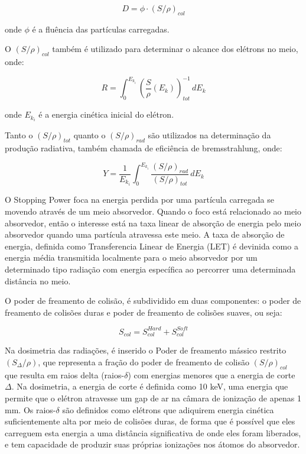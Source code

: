 \documentclass[11pt,a4paper]{article}
\begin{document}
                \begin{equation}
                    D = \phi \cdot (S/\rho)_{col}
                \end{equation}

            onde $\phi$ é a fluência das partículas carregadas. 

            O $(S/\rho)_{col}$ também é utilizado para determinar o alcance dos elétrons no meio, onde:

                \begin{equation}
                    R = \int_{0}^{E_{k_i}} \left(\frac{S}{\rho} (E_k)\right)_{tot}^{-1}  \,dE_k 
                \end{equation}

            onde $E_{k_i}$ é a energia cinética inicial do elétron. 

            Tanto o $(S/\rho)_{tot}$ quanto o $(S/\rho)_{rad}$ são utilizados na determinação da produção radiativa, também chamada de eficiência de bremsstrahlung, onde:

                \begin{equation}
                    Y = \frac{1}{E_{k_i}} \int_{0}^{E_{k_i}} \frac{(S/\rho)_{rad}}{(S/\rho)_{tot}} \,dE_k 
                \end{equation}

            O Stopping Power foca na energia perdida por uma partícula carregada se movendo através de um meio absorvedor. Quando o foco está relacionado ao meio absorvedor, então o interesse está na taxa linear de absorção de energia pelo meio absorvedor quando uma partícula atravessa este meio.  A taxa de absorção de energia, definida como Transferencia Linear de Energia (LET) é devinida como a energia média transmitida localmente para o meio absorvedor por um determinado tipo radiação com energia específica ao percorrer uma determinada distância no meio. 
            
            O poder de freamento de colisão, é subdividido em duas componentes: o poder de freamento de colisões duras e poder de freamento de colisões suaves, ou seja:

                \begin{equation}
                    S_{col} = S_{col}^{Hard} + S_{col}^{Soft}
                \end{equation}

            Na dosimetria das radiações, é inserido o Poder de freamento mássico restrito $(S_\Delta/\rho)$, que representa a fração do poder de freamento de colisão $(S/\rho)_{col}$ que resulta em raios delta (raios-$\delta$) com energias menores que a energia de corte $\Delta$. Na dosimetria, a energia de corte é definida como 10 keV, uma energia que permite que o elétron atravesse um gap de ar na câmara de ionização de apenas 1 mm. Os raios-$\delta$ são definidos como elétrons que adiquirem energia cinética suficientemente alta por meio de colisões duras, de forma que é possível que eles carreguem esta energia a uma distância significativa de onde eles foram liberados, e tem capacidade de produzir suas próprias ionizações nos átomos do absorvedor.
\end{document}
